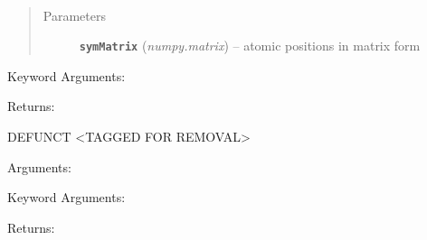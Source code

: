 \documentclass[letterpaper,10pt,english]{sphinxmanual}
\begin{document}
\begin{fulllineitems}
\label{retr:retr.__expandBoundariesNoScale}~\begin{quote}\begin{description}
\item[{Parameters}] \leavevmode
\textbf{\texttt{symMatrix}} (\emph{numpy.matrix}) -- atomic positions in matrix form

\end{description}\end{quote}

Keyword Arguments:

Returns:

\end{fulllineitems}


\begin{fulllineitems}
\label{retr:retr.__find_numkpoints}
DEFUNCT \textless{}TAGGED FOR REMOVAL\textgreater{}

Arguments:

Keyword Arguments:

Returns:

\end{fulllineitems}

\end{document}
